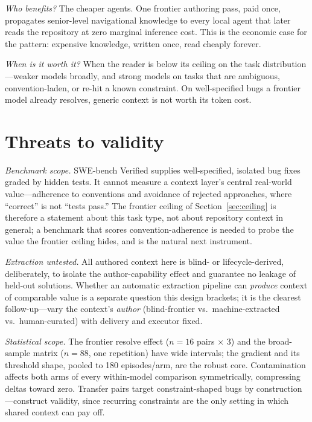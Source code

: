 \documentclass[sigconf,nonacm]{acmart}
\begin{document}
\emph{Who benefits?} The cheaper agents. One frontier authoring pass, paid once,
propagates senior-level navigational knowledge to every local agent that later
reads the repository at zero marginal inference cost. This is the economic case
for the pattern: expensive knowledge, written once, read cheaply forever.

\emph{When is it worth it?} When the reader is below its ceiling on the task
distribution---weaker models broadly, and strong models on tasks that are
ambiguous, convention-laden, or re-hit a known constraint. On well-specified
bugs a frontier model already resolves, generic context is not worth its token
cost.

\section{Threats to validity}\label{sec:threats}
\emph{Benchmark scope.} SWE-bench Verified supplies well-specified, isolated bug
fixes graded by hidden tests. It cannot measure a context layer's central
real-world value---adherence to conventions and avoidance of rejected
approaches, where ``correct'' is not ``tests pass.'' The frontier ceiling of
Section~\ref{sec:ceiling} is therefore a statement about this task type, not
about repository context in general; a benchmark that scores
convention-adherence is needed to probe the value the frontier ceiling hides,
and is the natural next instrument.

\emph{Extraction untested.} All authored context here is blind- or
lifecycle-derived, deliberately, to isolate the author-capability effect and
guarantee no leakage of held-out solutions. Whether an automatic extraction
pipeline can \emph{produce} context of comparable value is a separate question
this design brackets; it is the clearest follow-up---vary the context's
\emph{author} (blind-frontier vs.\ machine-extracted vs.\ human-curated) with
delivery and executor fixed.

\emph{Statistical scope.} The frontier resolve effect ($n=16$ pairs $\times$ 3)
and the broad-sample matrix ($n=88$, one repetition) have wide intervals; the
gradient and its threshold shape, pooled to 180 episodes/arm, are the robust
core. Contamination affects both arms of every within-model comparison
symmetrically, compressing deltas toward zero. Transfer pairs target
constraint-shaped bugs by construction---construct validity, since recurring
constraints are the only setting in which shared context can pay off.
\end{document}
